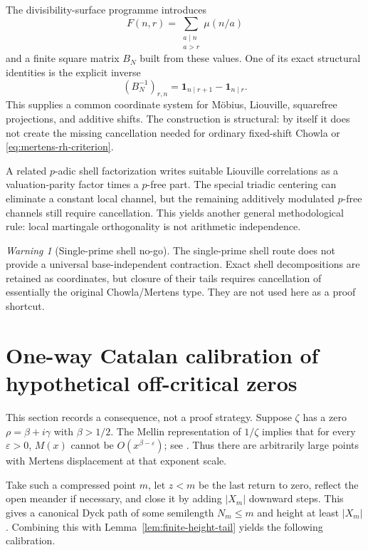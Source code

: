 \documentclass[11pt]{amsart}
\numberwithin{equation}{section}
\theoremstyle{plain}
\theoremstyle{definition}
\theoremstyle{remark}
\newtheorem{warning}[theorem]{Warning}
\newcommand{\Mert}{M}
\newcommand{\Mob}{\mu}
\newcommand{\eps}{\varepsilon}
\begin{document}
The divisibility-surface programme introduces
\begin{equation}
F(n,r)=\sum_{\substack{a\mid n\\a>r}}\Mob(n/a)
\label{eq:divisibility-surface}
\end{equation}
and a finite square matrix $B_N$ built from these values.  One of its exact structural identities is the explicit inverse
\begin{equation}
(B_N^{-1})_{r,n}=\mathbf 1_{n\mid r+1}-\mathbf 1_{n\mid r}.
\label{eq:surface-inverse}
\end{equation}
This supplies a common coordinate system for M\"obius, Liouville, squarefree projections, and additive shifts.  The construction is
structural: by itself it does not create the missing cancellation needed for ordinary fixed-shift Chowla or
\eqref{eq:mertens-rh-criterion}.

A related $p$-adic shell factorization writes suitable Liouville correlations as a valuation-parity factor times a $p$-free part.
The special triadic centering can eliminate a constant local channel, but the remaining additively modulated $p$-free channels still
require cancellation.  This yields another general methodological rule: local martingale orthogonality is not arithmetic
independence.

\begin{warning}[Single-prime shell no-go]
\label{warn:single-prime-no-go}
The single-prime shell route does not provide a universal base-independent contraction.  Exact shell decompositions are retained as
coordinates, but closure of their tails requires cancellation of essentially the original Chowla/Mertens type.  They are not used here
as a proof shortcut.
\end{warning}

\section{One-way Catalan calibration of hypothetical off-critical zeros}
\label{sec:offcritical-calibration}

This section records a consequence, not a proof strategy.  Suppose $\zeta$ has a zero
$\rho=\beta+i\gamma$ with $\beta>1/2$.  The Mellin representation of $1/\zeta$ implies that for every $\eps>0$,
$\Mert(x)$ cannot be $O(x^{\beta-\eps})$; see \cite{Titchmarsh1986}.  Thus there are arbitrarily large points with Mertens displacement at
that exponent scale.

Take such a compressed point $m$, let $z<m$ be the last return to zero, reflect the open meander if necessary, and close it by adding
$|X_m|$ downward steps.  This gives a canonical Dyck path of some semilength $N_m\le m$ and height at least $|X_m|$.  Combining this
with Lemma~\ref{lem:finite-height-tail} yields the following calibration.
\end{document}
